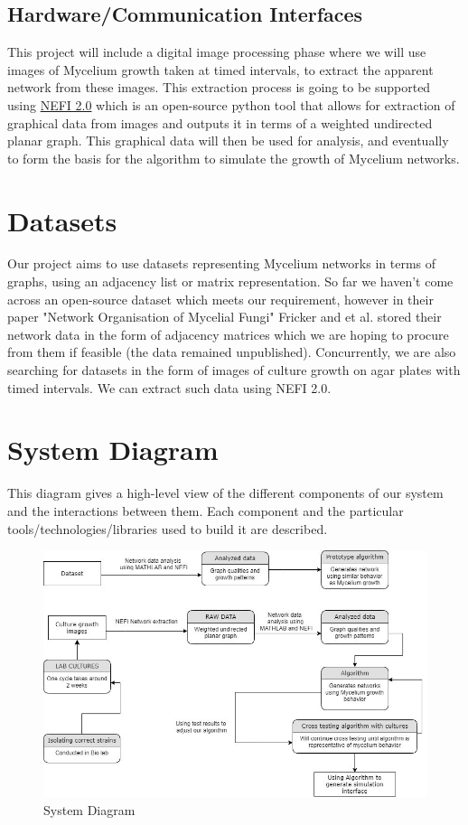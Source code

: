 \subsection{Hardware/Communication Interfaces}
This project will include a digital image processing phase where we will use images of Mycelium growth taken at timed intervals, to extract the apparent network from these images. This extraction process is going to be supported using \href{http://nefi.mpi-inf.mpg.de}{NEFI 2.0} which is an open-source python tool that allows for extraction of graphical data from images and outputs it in terms of a weighted undirected planar graph. This graphical data will then be used for analysis, and eventually to form the basis for the algorithm to simulate the growth of Mycelium networks.


\section{Datasets}
Our project aims to use datasets representing Mycelium networks in terms of graphs, using an adjacency list or matrix representation. So far we haven't come across an open-source dataset which meets our requirement, however in their paper "Network Organisation of Mycelial Fungi" Fricker and et al. \cite{networkmyc} stored their network data in the form of adjacency matrices which we are hoping to procure from them if feasible (the data remained unpublished). Concurrently, we are also searching for datasets in the form of images of culture growth on agar plates with timed intervals. We can extract such data using NEFI 2.0. 

\section{System Diagram}
This diagram gives a high-level view of the different components of our system and the interactions between them. Each component and the particular tools/technologies/libraries used to build it are described.

\begin{figure}[h!]
    \centering
    \includegraphics[scale=0.5]{Images/system_diag.png}
    \caption{System Diagram}
    \label{fig:sys_diag}
\end{figure}